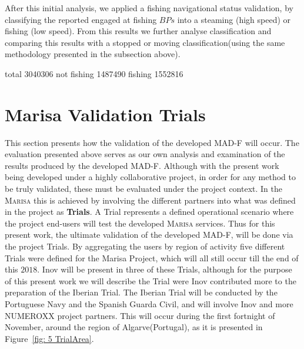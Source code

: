 After this initial analysis, we applied a fishing navigational status validation, by classifying the reported engaged at fishing $BPs$ into a steaming (high speed) or fishing (low speed). From this results we further analyse classification and comparing this results with a stopped or moving classification(using the same methodology presented in the subsection above).

total 3040306
not fishing 1487490
fishing 1552816


\section{Marisa Validation Trials}
\label{Section: 5 Marisa Validation}
This section presents how the validation of the developed MAD-F will occur. The evaluation presented above serves as our own analysis and examination of the results produced by the developed MAD-F. Although with the present work being developed under a highly collaborative project, in order for any method to be truly validated, these must be evaluated under the project context. In the \textsc{Marisa} this is achieved by involving the different partners into what was defined in the project as \textbf{Trials}. A Trial represents a defined operational scenario where the project end-users will test the developed \textsc{Marisa} services. Thus for this present work, the ultimate validation of the developed MAD-F, will be done via the project Trials. By aggregating the users by region of activity five different Trials were defined for the Marisa Project, which will all still occur till the end of this $2018$. Inov will be present in three of these Trials, although for the purpose of this present work we will describe the Trial were Inov contributed more to the preparation of the Iberian Trial. The Iberian Trial will be conducted by the Portuguese Navy and the Spanish Guarda Civil, and will involve Inov and more NUMEROXX project partners. This will occur during the first fortnight of November, around the region of Algarve(Portugal), as it is presented in Figure~\ref{fig: 5 TrialArea}.  


